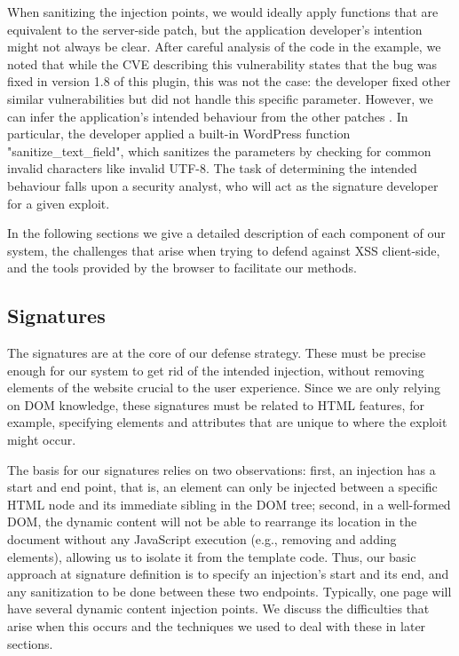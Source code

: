 When sanitizing the injection points, we would ideally apply functions that are equivalent to the server-side patch, but the application developer's intention might not always be clear. After careful analysis of the code in the example, we noted that while the CVE describing this vulnerability states that the bug was fixed in version 1.8 of this plugin, this was not the case: the developer fixed other similar vulnerabilities but did not handle this specific parameter. However, we can infer the application's intended behaviour from the other patches \cite{rccpatch}. In particular, the developer applied a built-in WordPress function "sanitize\_text\_field", which sanitizes the parameters by checking for common invalid characters like invalid UTF-8. The task of determining the intended behaviour falls upon a security analyst, who will act as the signature developer for a given exploit.  

In the following sections we give a detailed description of each component of our system, the challenges that arise when trying to defend against XSS client-side, and the tools provided by the browser to facilitate our methods. 
 
 \subsection{\sys Signatures} \label{signatures}
The signatures are at the core of our defense strategy. These must be precise enough for our system to get rid of the intended injection, without removing elements of the website crucial to the user experience. Since we are only relying on DOM knowledge, these signatures must be related to HTML features, for example, specifying elements and attributes that are unique to where the exploit might occur. 

The basis for our signatures relies on two observations: first, an injection has a start and end point, that is, an element can only be injected between a specific HTML node and its immediate sibling in the DOM tree; second, in a well-formed DOM, the dynamic content will not be able to rearrange its location in the document without any JavaScript execution (e.g., removing and adding elements), allowing us to isolate it from the template code. Thus, our basic approach at signature definition is to specify an injection's start and its end, and any sanitization to be done between these two endpoints. Typically, one page will have several dynamic content injection points. We discuss the difficulties that arise when this occurs and the techniques we used to deal with these in later sections.

